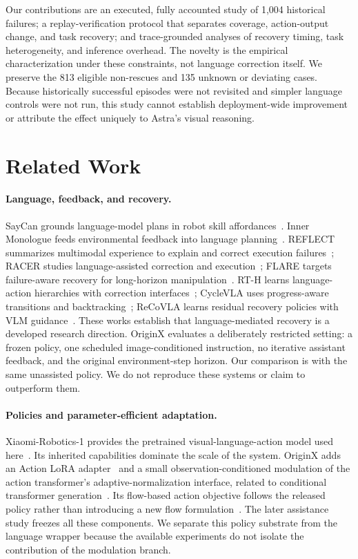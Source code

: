 \documentclass[10pt,twocolumn,letterpaper]{article}
\begin{document}
Our contributions are an executed, fully accounted study of 1,004 historical failures; a replay-verification protocol that separates coverage, action-output change, and task recovery; and trace-grounded analyses of recovery timing, task heterogeneity, and inference overhead. The novelty is the empirical characterization under these constraints, not language correction itself. We preserve the 813 eligible non-rescues and 135 unknown or deviating cases. Because historically successful episodes were not revisited and simpler language controls were not run, this study cannot establish deployment-wide improvement or attribute the effect uniquely to Astra's visual reasoning.

\section{Related Work}
\label{sec:related}
\paragraph{Language, feedback, and recovery.}
SayCan grounds language-model plans in robot skill affordances~\cite{saycan}. Inner Monologue feeds environmental feedback into language planning~\cite{innermonologue}. REFLECT summarizes multimodal experience to explain and correct execution failures~\cite{reflect}; RACER studies language-assisted correction and execution~\cite{racer}; FLARE targets failure-aware recovery for long-horizon manipulation~\cite{flare}. RT-H learns language-action hierarchies with correction interfaces~\cite{rth}; CycleVLA uses progress-aware transitions and backtracking~\cite{cyclevla}; ReCoVLA learns residual recovery policies with VLM guidance~\cite{recovla}. These works establish that language-mediated recovery is a developed research direction. OriginX evaluates a deliberately restricted setting: a frozen policy, one scheduled image-conditioned instruction, no iterative assistant feedback, and the original environment-step horizon. Our comparison is with the same unassisted policy. We do not reproduce these systems or claim to outperform them.

\paragraph{Policies and parameter-efficient adaptation.}
Xiaomi-Robotics-1 provides the pretrained visual-language-action model used here~\cite{xiaomi}. Its inherited capabilities dominate the scale of the system. OriginX adds an Action LoRA adapter~\cite{lora} and a small observation-conditioned modulation of the action transformer's adaptive-normalization interface, related to conditional transformer generation~\cite{dit}. Its flow-based action objective follows the released policy rather than introducing a new flow formulation~\cite{flow}. The later assistance study freezes all these components. We separate this policy substrate from the language wrapper because the available experiments do not isolate the contribution of the modulation branch.
\end{document}
